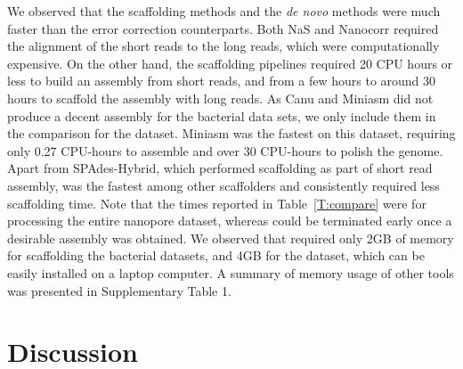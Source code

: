 We observed that the scaffolding methods and the
\emph{de novo} methods were much faster than the error correction counterparts.
Both NaS and Nanocorr 
required the alignment of the short reads to the long reads, which were
computationally expensive. On the other hand, the scaffolding pipelines
required 20 CPU hours or less to build an assembly from short reads,
and from a few hours to around 30 hours to scaffold the assembly with long 
reads. 
As Canu and Miniasm did not produce a decent assembly for the bacterial data 
sets, we only include them in the comparison for the \sce{} dataset. Miniasm
was the fastest on this dataset, requiring only 0.27 CPU-hours to assemble and
over 30 CPU-hours to polish the genome.
Apart from SPAdes-Hybrid, which performed scaffolding as part of short read
assembly, \npscarf{} was the fastest among other scaffolders and consistently required
less scaffolding time. Note that the times reported in Table~\ref{T:compare}
were for processing the entire nanopore dataset, whereas \npscarf{} could be
terminated early once a desirable assembly was obtained.
We observed that \npscarf{} required only 2GB of memory for scaffolding
the bacterial datasets, and 4GB for the \sce{} dataset, which can be easily
installed on a laptop computer. A summary of memory usage of other tools was
presented in Supplementary Table 1.

 
\section{Discussion}

